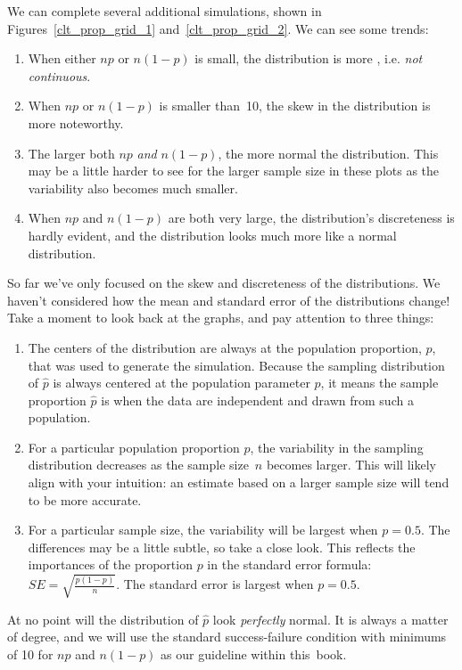 We can complete several additional simulations,
shown in
Figures~\ref{clt_prop_grid_1}
and~\ref{clt_prop_grid_2}.
We can see some trends:
\begin{enumerate}
\item When either $np$ or $n(1 - p)$ is small, the
    distribution is more ,
    i.e. \emph{not continuous}.
\item When $np$ or $n(1-p)$ is smaller than~10,
    the skew in the distribution is more noteworthy.
\item The larger both $np$ \emph{and} $n(1 - p)$,
    the more normal the distribution.
    This may be a little harder to see for the larger
    sample size in these plots as the variability
    also becomes much smaller.
\item When $np$ and $n(1 - p)$ are both very large,
    the distribution's discreteness is hardly evident,
    and the distribution looks much more
    like a normal distribution.
\end{enumerate}

So far we've only focused on the skew and discreteness
of the distributions. We haven't considered
how the mean and standard error
of the distributions change!
Take a moment to look back at the graphs,
and pay attention to three things:
\begin{enumerate}
\item The centers of the distribution are always at
    the population proportion, $p$, that was used to
    generate the simulation. Because the sampling
    distribution of $\hat{p}$ is always centered at
    the population parameter $p$, it means the sample
    proportion $\hat{p}$ is  when
    the data are independent and drawn from such
    a population.
\item For a particular population proportion $p$,
    the variability in the sampling distribution
    decreases as the sample size~$n$ becomes larger.
    This will likely align with your intuition:
    an estimate based on a larger sample size will
    tend to be more accurate.
\item For a particular sample size, the variability
    will be largest when $p = 0.5$. The differences
    may be a little subtle, so take a close look.
    This reflects the importances of the proportion
    $p$ in the standard error formula:
    $SE = \sqrt{\frac{p (1 - p)}{n}}$.
    The standard error is largest when $p = 0.5$.
\end{enumerate}

At no point will the distribution of $\hat{p}$ look
\emph{perfectly} normal.
It is always a matter of degree, and we will use
the standard success-failure condition with minimums
of 10 for $np$ and $n (1 - p)$ as our guideline
within this~book.




